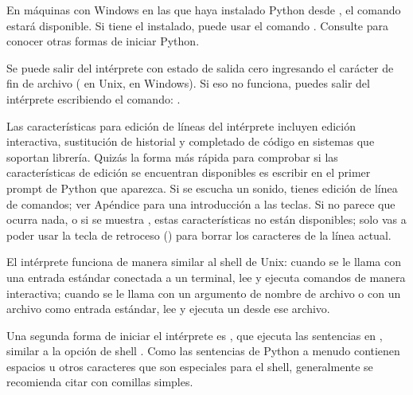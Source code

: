 \documentclass[a4,10pt,spanish]{sphinxmanual}
\begin{document}
\sphinxAtStartPar
En máquinas con Windows en las que haya instalado Python desde , el comando  estará disponible. Si tiene el  instalado, puede usar el comando . Consulte  para conocer otras formas de iniciar Python.

\sphinxAtStartPar
Se puede salir del intérprete con estado de salida cero ingresando el carácter de fin de archivo ( en Unix,  en Windows). Si eso no funciona, puedes salir del intérprete escribiendo el comando: .

\sphinxAtStartPar
Las características para edición de líneas del intérprete incluyen edición interactiva, sustitución de historial y completado de código en sistemas que soportan  librería. Quizás la forma más rápida para comprobar si las características de edición se encuentran disponibles es escribir  en el primer prompt de Python que aparezca. Si se escucha un sonido, tienes edición de línea de comandos; ver Apéndice {\hyperref[\detokenize{tutorial/interactive:tut-interacting}]{}} para una introducción a las teclas. Si no parece que ocurra nada, o si se muestra , estas características no están disponibles; solo vas a poder usar la tecla de retroceso () para borrar los caracteres de la línea actual.

\sphinxAtStartPar
El intérprete funciona de manera similar al shell de Unix: cuando se le llama con una entrada estándar conectada a un terminal, lee y ejecuta comandos de manera interactiva; cuando se le llama con un argumento de nombre de archivo o con un archivo como entrada estándar, lee y ejecuta un  desde ese archivo.

\sphinxAtStartPar
Una segunda forma de iniciar el intérprete es , que ejecuta las sentencias en , similar a la opción de shell  . Como las sentencias de Python a menudo contienen espacios u otros caracteres que son especiales para el shell, generalmente se recomienda citar  con comillas simples.
\end{document}
